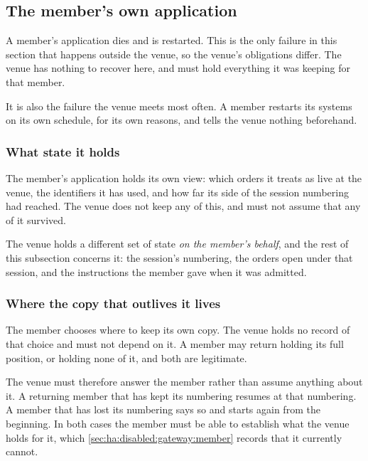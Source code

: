 \subsection{The member's own application}
\label{sec:ha:disabled:client}

A member's application dies and is restarted. This is the only failure in this
section that happens outside the venue, so the venue's obligations differ. The
venue has nothing to recover here, and must hold everything it was keeping for
that member.

It is also the failure the venue meets most often. A member restarts its systems
on its own schedule, for its own reasons, and tells the venue nothing beforehand.

\subsubsection{What state it holds}
\label{sec:ha:disabled:client:state}

The member's application holds its own view: which orders it treats as live at
the venue, the identifiers it has used, and how far its side of the session
numbering had reached. The venue does not keep any of this, and must not assume
that any of it survived.

The venue holds a different set of state \emph{on the member's behalf}, and the
rest of this subsection concerns it: the session's numbering, the orders open
under that session, and the instructions the member gave when it was
admitted.

\subsubsection{Where the copy that outlives it lives}
\label{sec:ha:disabled:client:durable}

The member chooses where to keep its own copy. The venue holds no record of that
choice and must not depend on it. A member may return holding its full position,
or holding none of it, and both are legitimate.

The venue must therefore answer the member rather than assume anything about it.
A returning member that has kept its numbering resumes at that numbering. A
member that has lost its numbering says so and starts again from the beginning.
In both cases the member must be able to establish what the venue holds for it,
which \cref{sec:ha:disabled:gateway:member} records that it currently cannot.

